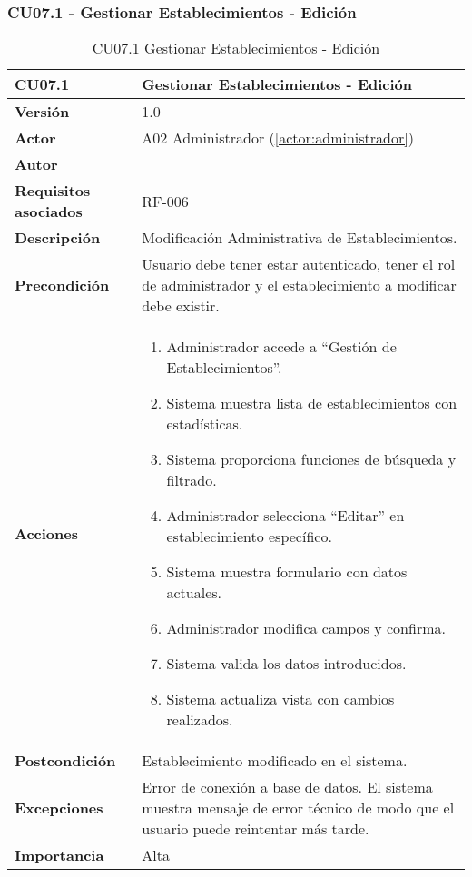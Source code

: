 \subsubsection{CU07.1 - Gestionar Establecimientos - Edición}

\begin{table}[H]
	\centering
	\begin{tabularx}{\linewidth}{ p{} p{} }
		\toprule
		\textbf{CU07.1}    & \textbf{Gestionar Establecimientos - Edición} \\
		\toprule
		\textbf{Versión}              & 1.0    \\
		\textbf{Actor}                & A02 Administrador (\ref{actor:administrador}) \\
		\textbf{Autor}                & \nombre \\
		\textbf{Requisitos asociados} & RF-006 \\
		\textbf{Descripción}          & Modificación Administrativa de Establecimientos. \\
		\textbf{Precondición}         & Usuario debe tener estar autenticado, tener el rol de administrador y el establecimiento a modificar debe existir. \\
		\textbf{Acciones}             &
		\begin{enumerate}
			\def\labelenumi{\arabic{enumi}.}
			\tightlist
			\item Administrador accede a ``Gestión de Establecimientos''.
            \item Sistema muestra lista de establecimientos con estadísticas.
            \item Sistema proporciona funciones de búsqueda y filtrado.
            \item Administrador selecciona ``Editar'' en establecimiento específico.
 	    \item Sistema muestra formulario con datos actuales.
            \item Administrador modifica campos y confirma.
            \item Sistema valida los datos introducidos.
            \item Sistema actualiza vista con cambios realizados.
		\end{enumerate}\\
		\textbf{Postcondición}        & Establecimiento modificado en el sistema.\\
		\textbf{Excepciones}          & Error de conexión a base de datos. El sistema muestra mensaje de error técnico de modo que el usuario puede reintentar más tarde.\\
		\textbf{Importancia}          & Alta \\
		\bottomrule
	\end{tabularx}
	\caption{CU07.1 Gestionar Establecimientos - Edición}
	\label{cu:gestionar-establecimientos-edicion}
\end{table}

